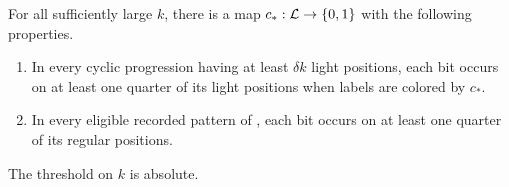 \begin{proposition}\label{outer:coloring}
For all sufficiently large $k$, there is a map
$c_*:\mathcal L\to\{0,1\}$ with the following properties.
\begin{enumerate}[label=\textup{(\roman*)}]
 \item In every cyclic progression having at least $\delta k$ light
 positions, each bit occurs on at least one quarter of its light
 positions when labels are colored by $c_*$.
 \item In every eligible recorded pattern of ,
 each bit occurs on at least one quarter of its regular positions.
\end{enumerate}
The threshold on $k$ is absolute.
\end{proposition}

